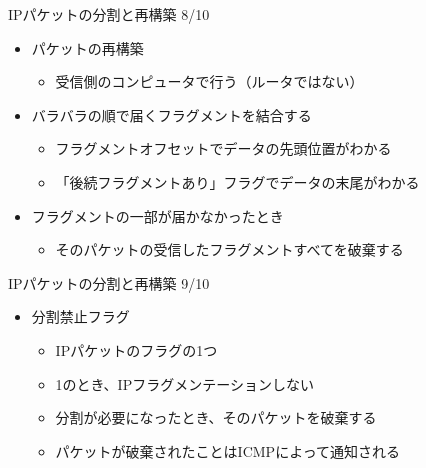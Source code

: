 \documentclass[12pt,aspectratio=169]{beamer}
\begin{document}
\begin{frame}{IPパケットの分割と再構築 8/10}
  \begin{itemize}
    \item パケットの再構築
      \begin{itemize}
        \item 受信側のコンピュータで行う（ルータではない）
      \end{itemize}
    \item バラバラの順で届くフラグメントを結合する
      \begin{itemize}
        \item フラグメントオフセットでデータの先頭位置がわかる
        \item 「後続フラグメントあり」フラグでデータの末尾がわかる
      \end{itemize}
    \item フラグメントの一部が届かなかったとき
      \begin{itemize}
        \item そのパケットの受信したフラグメントすべてを破棄する
      \end{itemize}

  \end{itemize}

\end{frame}


\begin{frame}{IPパケットの分割と再構築 9/10}
  \begin{itemize}
    \item 分割禁止フラグ
      \begin{itemize}
        \item IPパケットのフラグの1つ
        \item 1のとき、IPフラグメンテーションしない
        \item 分割が必要になったとき、そのパケットを破棄する
        \item パケットが破棄されたことはICMPによって通知される
      \end{itemize}

  \end{itemize}

\end{frame}
\end{document}
